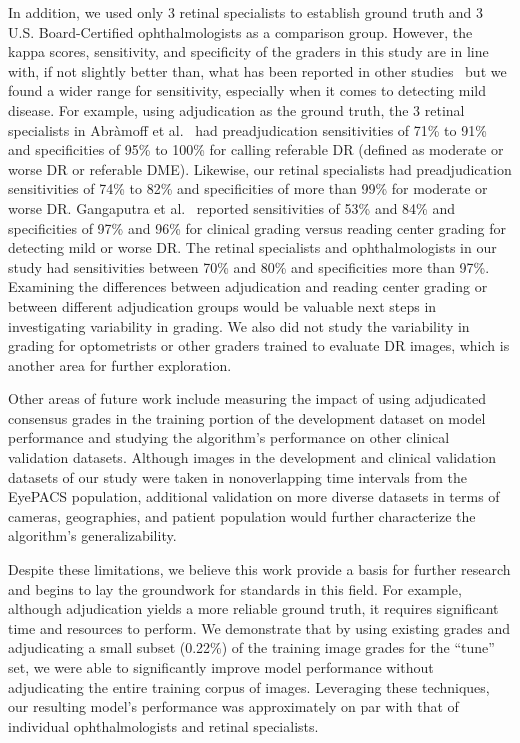 \documentclass{llncs}
\begin{document}
In addition, we used only 3 retinal specialists to establish ground truth and 3 U.S. Board-Certified ophthalmologists as a comparison group. However, the kappa scores, sensitivity, and specificity of the graders in this study are in line with, if not slightly better than, what has been reported in other studies~\cite{gangaputra2013comparison,ruamviboonsuk2006interobserver,gonzalez1995concordance,abramoff2013automated} but we found a wider range for sensitivity, especially when it comes to detecting mild disease. For example, using adjudication as the ground truth, the 3 retinal specialists in Abr\`amoff et al.~\cite{abramoff2013automated} had preadjudication sensitivities of 71\% to 91\% and specificities of 95\% to 100\% for calling referable DR (defined as moderate or worse DR or referable DME). Likewise, our retinal specialists had preadjudication sensitivities of 74\% to 82\% and specificities of more than 99\% for moderate or worse DR. Gangaputra et al.~\cite{gangaputra2013comparison} reported sensitivities of 53\% and 84\% and specificities of 97\% and 96\% for clinical grading versus reading center grading for detecting mild or worse DR. The retinal specialists and ophthalmologists in our study had sensitivities between 70\% and 80\% and specificities more than 97\%. Examining the differences between adjudication and reading center grading or between different adjudication groups would be valuable next steps in investigating variability in grading. We also did not study the variability in grading for optometrists or other graders trained to evaluate DR images, which is another area for further exploration.

Other areas of future work include measuring the impact of using adjudicated consensus grades in the training portion of the development dataset on model performance and studying the algorithm's performance on other clinical validation datasets. Although images in the development and clinical validation datasets of our study were taken in nonoverlapping time intervals from the EyePACS population, additional validation on more diverse datasets in terms of cameras, geographies, and patient population would further characterize the algorithm's generalizability.

Despite these limitations, we believe this work provide a basis for further research and begins to lay the groundwork for standards in this field. For example, although adjudication yields a more reliable ground truth, it requires significant time and resources to perform. We demonstrate that by using existing grades and adjudicating a small subset (0.22\%) of the training image grades for the ``tune'' set, we were able to significantly improve model performance without adjudicating the entire training corpus of images.  Leveraging these techniques, our resulting model's performance was approximately on par with that of individual ophthalmologists and retinal specialists.
\end{document}
